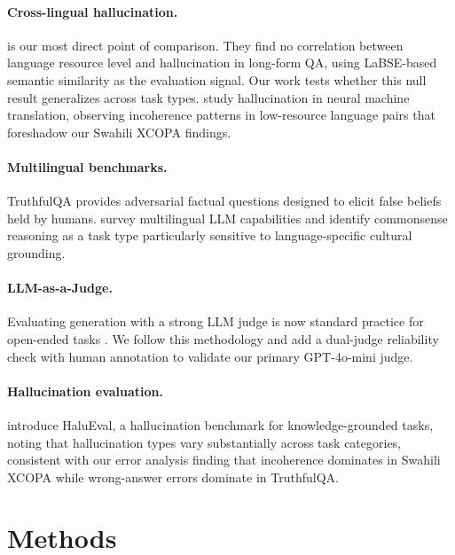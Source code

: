 \documentclass[11pt]{article}
\begin{document}
\paragraph{Cross-lingual hallucination.}
\citet{ulislam-etal-2025-hallucinate} is our most direct point of comparison.
They find no correlation between language resource level and hallucination in
long-form QA, using LaBSE-based semantic similarity as the evaluation signal.
Our work tests whether this null result generalizes across task types.
\citet{guerreiro-etal-2023-hallucinations} study hallucination in neural machine
translation, observing incoherence patterns in low-resource language pairs that
foreshadow our Swahili XCOPA findings.

\paragraph{Multilingual benchmarks.}
TruthfulQA \cite{lin-etal-2022-truthfulqa} provides adversarial factual
questions designed to elicit false beliefs held by humans.
\citet{qin-etal-2024-multilingual} survey multilingual LLM capabilities and
identify commonsense reasoning as a task type particularly sensitive to
language-specific cultural grounding.

\paragraph{LLM-as-a-Judge.}
Evaluating generation with a strong LLM judge is now standard practice for
open-ended tasks \cite{kang-etal-2024-comparing}. We follow this methodology
and add a dual-judge reliability check with human annotation to validate our
primary GPT-4o-mini judge.

\paragraph{Hallucination evaluation.}
\citet{li-etal-2023-halueval} introduce HaluEval, a hallucination benchmark for
knowledge-grounded tasks, noting that hallucination types vary substantially
across task categories, consistent with our error analysis finding that
incoherence dominates in Swahili XCOPA while wrong-answer errors dominate
in TruthfulQA.

\section{Methods}
\end{document}

